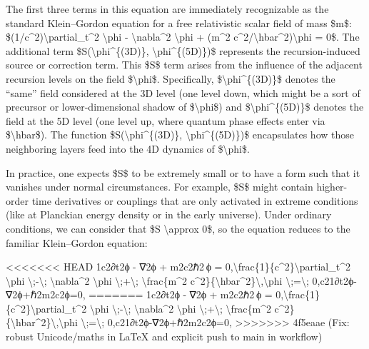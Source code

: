 \documentclass[]{article}
\begin{document}
The first three terms in this equation are immediately recognizable as
the standard Klein--Gordon equation for a free relativistic scalar field
of mass \$m\$: \$(1/c\^{}2)\textbackslash{}partial\_t\^{}2
\textbackslash{}phi - \textbackslash{}nabla\^{}2 \textbackslash{}phi +
(m\^{}2 c\^{}2/\textbackslash{}hbar\^{}2)\textbackslash{}phi = 0\$. The
additional term \$S(\textbackslash{}phi\^{}\{(3D)\},
\textbackslash{}phi\^{}\{(5D)\})\$ represents the recursion-induced
source or correction term. This \$S\$ term arises from the influence of
the adjacent recursion levels on the field \$\textbackslash{}phi\$.
Specifically, \$\textbackslash{}phi\^{}\{(3D)\}\$ denotes the ``same''
field considered at the 3D level (one level down, which might be a sort
of precursor or lower-dimensional shadow of \$\textbackslash{}phi\$) and
\$\textbackslash{}phi\^{}\{(5D)\}\$ denotes the field at the 5D level
(one level up, where quantum phase effects enter via
\$\textbackslash{}hbar\$). The function
\$S(\textbackslash{}phi\^{}\{(3D)\}, \textbackslash{}phi\^{}\{(5D)\})\$
encapsulates how those neighboring layers feed into the 4D dynamics of
\$\textbackslash{}phi\$.

In practice, one expects \$S\$ to be extremely small or to have a form
such that it vanishes under normal circumstances. For example, \$S\$
might contain higher-order time derivatives or couplings that are only
activated in extreme conditions (like at Planckian energy density or in
the early universe). Under ordinary conditions, we can consider that \$S
\textbackslash{}approx 0\$, so the equation reduces to the familiar
Klein--Gordon equation:

<<<<<<< HEAD
1c2∂t2ϕ  -  ∇2ϕ  +  m2c2ℏ2 ϕ  =  0,\textbackslash frac\{1\}\{c\^{}2\}\textbackslash partial\_t\^{}2
\textbackslash phi \textbackslash;-\textbackslash;
\textbackslash nabla\^{}2 \textbackslash phi
\textbackslash;+\textbackslash; \textbackslash frac\{m\^{}2
c\^{}2\}\{\textbackslash hbar\^{}2\}\textbackslash,\textbackslash phi
\textbackslash;=\textbackslash;
0,c21\hspace{0pt}∂t2\hspace{0pt}ϕ-∇2ϕ+ℏ2m2c2\hspace{0pt}ϕ=0,
=======
1c2∂t2ϕ  -  ∇2ϕ  +  m2c2ℏ2 ϕ  =  0,\textbackslash{}frac\{1\}\{c\^{}2\}\textbackslash{}partial\_t\^{}2
\textbackslash{}phi \textbackslash{};-\textbackslash{};
\textbackslash{}nabla\^{}2 \textbackslash{}phi
\textbackslash{};+\textbackslash{}; \textbackslash{}frac\{m\^{}2
c\^{}2\}\{\textbackslash{}hbar\^{}2\}\textbackslash{},\textbackslash{}phi
\textbackslash{};=\textbackslash{}; 0,c21​∂t2​ϕ-∇2ϕ+ℏ2m2c2​ϕ=0,
>>>>>>> 4f5eaae (Fix: robust Unicode/maths in LaTeX and explicit push to main in workflow)
\end{document}
